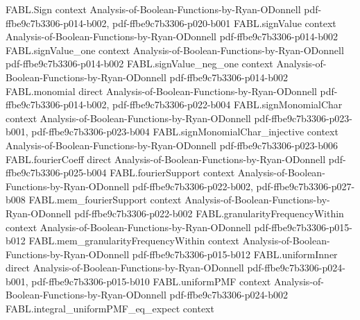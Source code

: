 \begin{theorem}
\label{FABL.selectionFunction_biased_expansion}
\leanok
{}
\proofstep
  {FABL.Sign}
  {context}
  {Analysis-of-Boolean-Functions-by-Ryan-ODonnell}
  {pdf-ffbe9c7b3306-p014-b002,
    pdf-ffbe9c7b3306-p020-b001}
\proofstep
  {FABL.signValue}
  {context}
  {Analysis-of-Boolean-Functions-by-Ryan-ODonnell}
  {pdf-ffbe9c7b3306-p014-b002}
\proofstep
  {FABL.signValue_one}
  {context}
  {Analysis-of-Boolean-Functions-by-Ryan-ODonnell}
  {pdf-ffbe9c7b3306-p014-b002}
\proofstep
  {FABL.signValue_neg_one}
  {context}
  {Analysis-of-Boolean-Functions-by-Ryan-ODonnell}
  {pdf-ffbe9c7b3306-p014-b002}
\proofstep
  {FABL.monomial}
  {direct}
  {Analysis-of-Boolean-Functions-by-Ryan-ODonnell}
  {pdf-ffbe9c7b3306-p014-b002,
    pdf-ffbe9c7b3306-p022-b004}
\proofstep
  {FABL.signMonomialChar}
  {context}
  {Analysis-of-Boolean-Functions-by-Ryan-ODonnell}
  {pdf-ffbe9c7b3306-p023-b001,
    pdf-ffbe9c7b3306-p023-b004}
\proofstep
  {FABL.signMonomialChar_injective}
  {context}
  {Analysis-of-Boolean-Functions-by-Ryan-ODonnell}
  {pdf-ffbe9c7b3306-p023-b006}
\proofstep
  {FABL.fourierCoeff}
  {direct}
  {Analysis-of-Boolean-Functions-by-Ryan-ODonnell}
  {pdf-ffbe9c7b3306-p025-b004}
\proofstep
  {FABL.fourierSupport}
  {context}
  {Analysis-of-Boolean-Functions-by-Ryan-ODonnell}
  {pdf-ffbe9c7b3306-p022-b002,
    pdf-ffbe9c7b3306-p027-b008}
\proofstep
  {FABL.mem_fourierSupport}
  {context}
  {Analysis-of-Boolean-Functions-by-Ryan-ODonnell}
  {pdf-ffbe9c7b3306-p022-b002}
\proofstep
  {FABL.granularityFrequencyWithin}
  {context}
  {Analysis-of-Boolean-Functions-by-Ryan-ODonnell}
  {pdf-ffbe9c7b3306-p015-b012}
\proofstep
  {FABL.mem_granularityFrequencyWithin}
  {context}
  {Analysis-of-Boolean-Functions-by-Ryan-ODonnell}
  {pdf-ffbe9c7b3306-p015-b012}
\proofstep
  {FABL.uniformInner}
  {direct}
  {Analysis-of-Boolean-Functions-by-Ryan-ODonnell}
  {pdf-ffbe9c7b3306-p024-b001,
    pdf-ffbe9c7b3306-p015-b010}
\proofstep
  {FABL.uniformPMF}
  {context}
  {Analysis-of-Boolean-Functions-by-Ryan-ODonnell}
  {pdf-ffbe9c7b3306-p024-b002}
\proofstep
  {FABL.integral_uniformPMF_eq_expect}
  {context}

\end{theorem}
